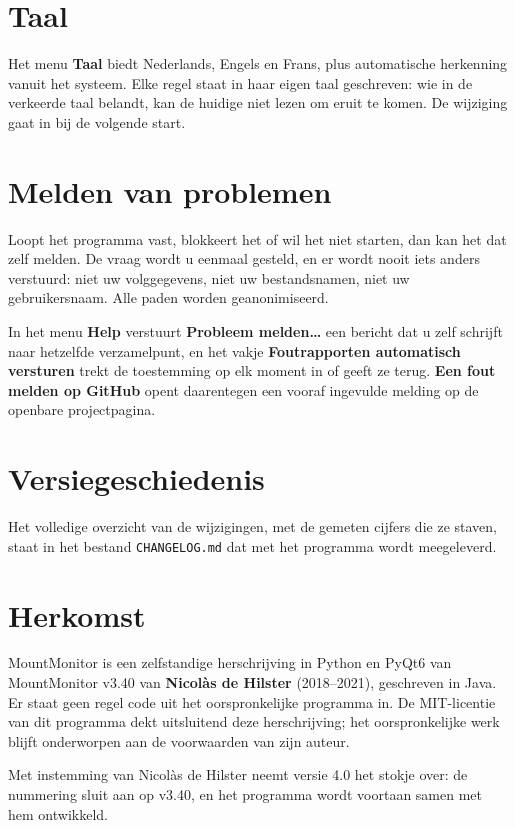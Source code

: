 \section{Taal}

Het menu \textbf{Taal} biedt Nederlands, Engels en Frans, plus automatische
herkenning vanuit het systeem. Elke regel staat in haar eigen taal geschreven:
wie in de verkeerde taal belandt, kan de huidige niet lezen om eruit te komen.
De wijziging gaat in bij de volgende start.

\section{Melden van problemen}

Loopt het programma vast, blokkeert het of wil het niet starten, dan kan het
dat zelf melden. De vraag wordt u eenmaal gesteld, en er wordt nooit iets
anders verstuurd: niet uw volggegevens, niet uw bestandsnamen, niet uw
gebruikersnaam. Alle paden worden geanonimiseerd.

In het menu \textbf{Help} verstuurt \textbf{Probleem melden\ldots} een
bericht dat u zelf schrijft naar hetzelfde verzamelpunt, en het vakje
\textbf{Foutrapporten automatisch versturen} trekt de toestemming op elk
moment in of geeft ze terug. \textbf{Een fout melden op GitHub} opent
daarentegen een vooraf ingevulde melding op de openbare projectpagina.

\section{Versiegeschiedenis}

Het volledige overzicht van de wijzigingen, met de gemeten cijfers die ze
staven, staat in het bestand \texttt{CHANGELOG.md} dat met het programma wordt
meegeleverd.

\section{Herkomst}

MountMonitor is een zelfstandige herschrijving in Python en PyQt6 van
MountMonitor v3.40 van \textbf{Nicolàs de Hilster} (2018--2021), geschreven in
Java. Er staat geen regel code uit het oorspronkelijke programma in. De
MIT-licentie van dit programma dekt uitsluitend deze herschrijving; het
oorspronkelijke werk blijft onderworpen aan de voorwaarden van zijn auteur.

Met instemming van Nicolàs de Hilster neemt versie 4.0 het stokje over: de
nummering sluit aan op v3.40, en het programma wordt voortaan samen met hem
ontwikkeld.
